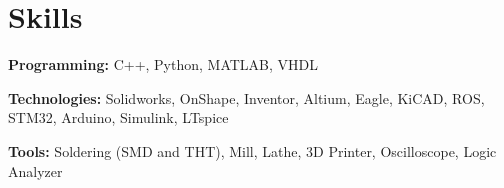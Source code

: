 \documentclass[letterpaper,11pt]{article}
\makeatletter
\newcommand{\resumeItem}[1]{
  \item\small{
    {#1 \vspace{-2pt}}
  }
}
\newcommand{\resumeProjectHeading}[2]{
    \vspace{-2pt}\item
    \begin{tabular*}{0.97\textwidth}{l@{\extracolsep{\fill}}r}
      \small#1 & #2 \\
    \end{tabular*}\vspace{-7pt}
}
\newcommand{\resumeSubHeadingListStart}{\begin{itemize}[leftmargin=0.15in, label={}]}
\newcommand{\resumeSubHeadingListEnd}{\end{itemize}}
\newcommand{\resumeItemListStart}{\begin{itemize}}
\newcommand{\resumeItemListEnd}{\end{itemize}\vspace{-5pt}}
\makeatother
\begin{document}
\section{Skills}
  \vspace{2pt}
  \resumeSubHeadingListStart
    \small{\item{
        \textbf{Programming:}{ C++, Python, MATLAB, VHDL} \\ \vspace{3pt}
        
        \textbf{Technologies:}{ Solidworks, OnShape, Inventor, Altium, Eagle, KiCAD, ROS, STM32, Arduino, Simulink, LTspice} \\ \vspace{3pt}
        
        \textbf{Tools:}{ Soldering (SMD and THT), Mill, Lathe, 3D Printer, Oscilloscope, Logic Analyzer}
        
    }}
  \resumeSubHeadingListEnd




      
      
\end{document}
